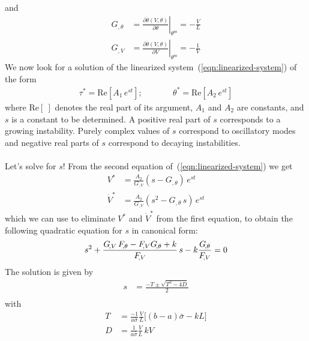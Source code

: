 \documentclass[letterpaper,12pt,]{memoir}
\begin{document}
and
\begin{equation}
\begin{aligned}
G_{\!,\theta}&=\left.\frac{\partial\dot{\theta}(V,\theta)}{\partial\theta}\right|_{\theta^\text{ss}}=-\frac{V}{L}\\
G_{\!,V}&=\left.\frac{\partial\dot{\theta}(V,\theta)}{\partial V}\right|_{\theta^\text{ss}}=-\frac{1}{V}
\end{aligned}
\end{equation}
%
We now look for a solution of the linearized system~(\ref{eqn:linearized-system}) of the form
\begin{equation}
\begin{aligned}
\tau^*=\text{Re}[A_1\,e^{st}]; & \qquad & \theta^*=\text{Re}[A_2\,e^{st}]
\end{aligned}
\end{equation}
where $\text{Re}[~]$ denotes the real part of its argument, $A_1$ and $A_2$ are constants, and $s$ is a constant to be determined. A positive real part of $s$ corresponds to a growing instability. Purely complex values of $s$ correspond to oscillatory modes and negative real parts of $s$ correspond to decaying instabilities. \\
\\
Let's solve for $s$! From the second equation of~(\ref{eqn:linearized-system}) we get 
\begin{equation}
\begin{aligned}
V^*&=\frac{A_2}{G_{\!,V}}\left(s-G_{\!,\theta}\right)\,e^{st}\\
\dot{V}^*&=\frac{A_2}{G_{\!,V}}\left(s^2-G_{\!,\theta}\,s\right)\,e^{st}
\end{aligned}
\end{equation}
which we can use to eliminate $V^*$ and $\dot{V}^*$ from the first equation, to obtain the following quadratic equation for $s$ in canonical form:
\begin{equation}
s^2+\frac{G_{\!,V}\,F_{\!,\theta}-F_{\!,V}G_{\!,\theta}+k}{F_{\!,V}}\,s-k\frac{G_{\!,\theta}}{F_{\!,V}}=0\\
\end{equation}
The solution is given by
\begin{equation}
\begin{aligned}
s&=\frac{-T\pm\sqrt{T^2-4D}}{2}\\
\end{aligned}
\end{equation}
with
\begin{equation}
\begin{aligned}
T&=\frac{-1}{a\bar{\sigma}}\frac{V}{L}\big[(b-a)\bar{\sigma}-kL\big]\\
D&=\frac{1}{a\bar{\sigma}}\frac{V}{L}\,kV
\end{aligned}
\end{equation}
\end{document}
